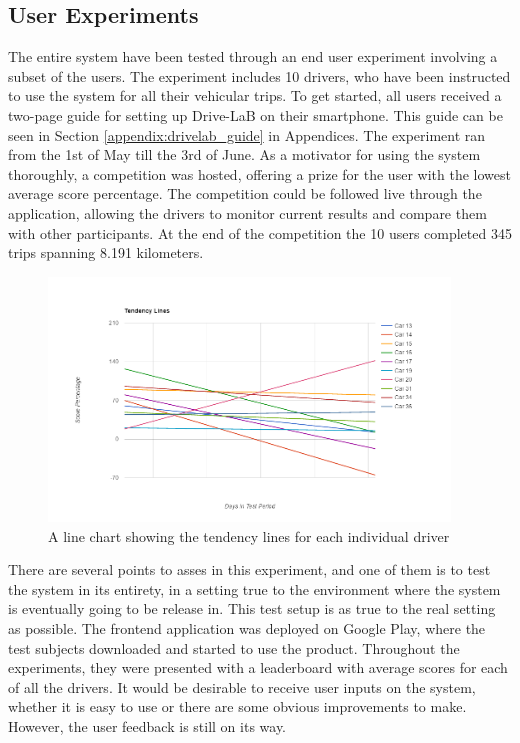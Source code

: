 \subsection{User Experiments}\label{subsec:userexp}

The entire system have been tested through an end user experiment involving a subset of the users. The experiment includes 10 drivers, who have been instructed to use the system for all their vehicular trips. To get started, all users received a two-page guide for setting up Drive-LaB on their smartphone. This guide can be seen in Section \ref{appendix:drivelab_guide} in Appendices. The experiment ran from the 1st of May till the 3rd of June. As a motivator for using the system thoroughly, a competition was hosted, offering a prize for the user with the lowest average score percentage. The competition could be followed live through the application, allowing the drivers to monitor current results and compare them with other participants. At the end of the competition the 10 users completed 345 trips spanning 8.191 kilometers.

\begin{figure}[tb]
\centering
\includegraphics[width=0.95\textwidth]{Pictures/tendenslinjer}
\caption{A line chart showing the tendency lines for each individual driver}
\label{fig:tendencylines}
\end{figure}

There are several points to asses in this experiment, and one of them is to test the system in its entirety, in a setting true to the environment where the system is eventually going to be release in. This test setup is as true to the real setting as possible. The frontend application was deployed on Google Play, where the test subjects downloaded and started to use the product. Throughout the experiments, they were presented with a leaderboard with average scores for each of all the drivers. 
It would be desirable to receive user inputs on the system, whether it is easy to use or there are some obvious improvements to make. However, the user feedback is still on its way.

